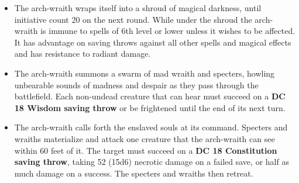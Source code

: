 \begin{itemize}
  \item The arch-wraith wraps itself into a shroud of magical
  darkness, until initiative count 20 on the next round. While
  under the shroud the arch-wraith is immune to spells of
  6th level or lower unless it wishes to be affected. It has
  advantage on saving throws against all other spells and
  magical effects and has resistance to radiant damage.

  \item The arch-wraith summons a swarm of mad wraith and
  specters, howling unbearable sounds of madness and despair as they pass through the battlefield. Each non-undead creature that can hear must succeed on a
  \textbf{DC 18 Wisdom saving throw} or be frightened until the end of its
  next turn.

  \item The arch-wraith calls forth the enslaved souls at its
  command. Specters and wraiths materialize and attack
  one creature that the arch-wraith can see within 60 feet of
  it. The target must succeed on a \textbf{DC 18 Constitution
  saving throw}, taking 52 (15d6) necrotic damage on a failed
  save, or half as much damage on a success. The specters
  and wraiths then retreat.
\end{itemize}
